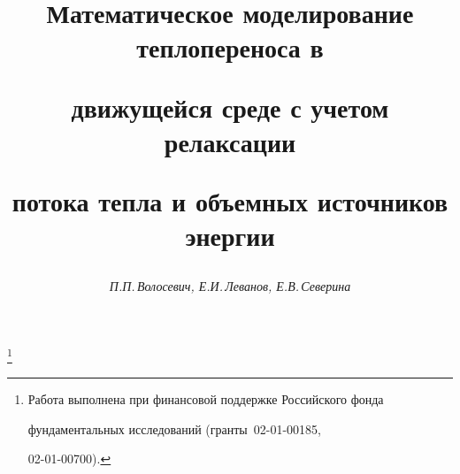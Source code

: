 















\newcommand{\const}{\operatorname{const}}


\newcommand{\tts}[1]{}







\setcounter{page}{31}















\author{\it П.П.\,Волосевич, Е.И.\,Леванов, Е.В.\,Северина}




\title{Математическое моделирование теплопереноса в


движущейся среде с учетом релаксации


потока тепла и объемных источников энергии}


\thanks{Работа выполнена при финансовой поддержке Российского фонда


фундаментальных исследований (гранты \No\No\,02-01-00185,


02-01-00700).}





\date{}




